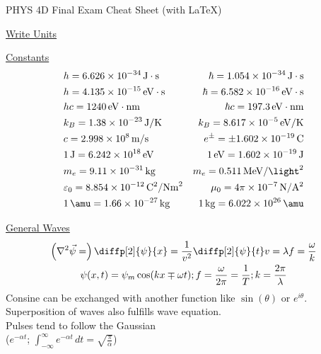 \documentclass[8pt]{extarticle}
\newcommand{\E}[1]{\times 10^{#1}}
\begin{document}

    \setlength{\parindent}{0pt}
    \setlength{\columnsep}{0.5cm}
    \twocolumn
    PHYS 4D Final Exam Cheat Sheet (with \LaTeX)

    \underline{Write Units}

    \underline{Constants}
        \begin{align*}
            &h = 6.626\E{-34}\,\unit{\joule\cdot\second}    &\hbar = 1.054\E{-34}\,\unit{\joule\cdot\second}\\
            &h = 4.135\E{-15}\,\unit{\eV\cdot\second}    &\hbar = 6.582\E{-16}\,\unit{\eV\cdot\second}\\
            &hc = 1240\,\unit{\eV\cdot\nano\meter}  &\hbar c = 197.3\,\unit{\eV\cdot\nano\meter}\\
            &k_B = 1.38\E{-23}\,\unit{\joule/\kelvin}   &k_B = 8.617\E{-5}\,\unit{\eV/\kelvin}\\
            &c = 2.998\E{8}\,\unit{\meter/\second}   &e^{\pm} = \pm 1.602\E{-19}\,\unit{\coulomb}\\
            &1\,\unit{\joule} = 6.242\E{18}\,\unit{\eV} &1\,\unit{\eV} = 1.602\E{-19}\,\unit{\joule}\\
            &m_e = 9.11\E{-31}\,\unit{\kilo\gram} &m_e = 0.511\,\unit{\mega\eV/\light^2}\\
            &\varepsilon_0 = 8.854\E{-12}\,\unit{\coulomb^2/\newton\meter^2} &\mu_0 = 4\pi\E{-7}\,\unit{\newton/\ampere^2}\\
            &1\,\unit{\amu} = 1.66\E{-27}\,\unit{\kilo\gram}    &1\,\unit{\kilo\gram} = 6.022\E{26}\,\unit{\amu}
        \end{align*}
    
    \underline{General Waves}
    \begin{gather*}
        \left( \nabla^2 \vec{\psi} = \right) \diffp[2]{\psi}{x} = \frac{1}{v^2}\diffp[2]{\psi}{t}
        v = \lambda f = \frac{\omega}{k}\\
        \psi(x,t) = \psi_m \cos(kx \mp \omega t);
        f = \frac{\omega}{2\pi} = \frac{1}{T}; k = \frac{2\pi}{\lambda}
    \end{gather*}
    Consine can be exchanged with another function like $\sin(\theta)$ or $e^{i\theta}$.\\
    Superposition of waves also fulfills wave equation.\\
    Pulses tend to follow the Gaussian \\
    ($e^{-\alpha t}$; $\int_{-\infty}^{\infty} e^{-\alpha t}\,dt = \sqrt{\frac{\pi}{\alpha}}$)
\end{document}
